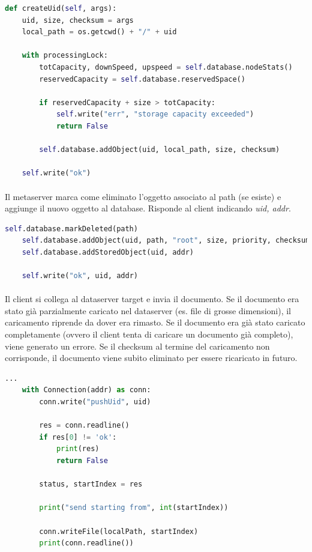 \documentclass[11pt,a4paper,english]{article}
\begin{document}
\begin{lstlisting}[language=Python, title=Dataserver]
def createUid(self, args):
	uid, size, checksum = args
	local_path = os.getcwd() + "/" + uid
	
	with processingLock:
		totCapacity, downSpeed, upspeed = self.database.nodeStats()
		reservedCapacity = self.database.reservedSpace()
		
		if reservedCapacity + size > totCapacity:
			self.write("err", "storage capacity exceeded")
			return False
		
		self.database.addObject(uid, local_path, size, checksum)
		
	self.write("ok")
\end{lstlisting}

\paragraph{} Il metaserver marca come eliminato l'oggetto associato al path (se esiste) e aggiunge il nuovo oggetto al database. Risponde al client indicando \emph{uid, addr}. 

\begin{lstlisting}[language=Python, title=Metaserver]
    self.database.markDeleted(path)
    self.database.addObject(uid, path, "root", size, priority, checksum)
    self.database.addStoredObject(uid, addr)

    self.write("ok", uid, addr)
\end{lstlisting}

\paragraph{} Il client si collega al dataserver target e invia il documento. Se il documento era stato già parzialmente caricato nel dataserver (es. file di grosse dimensioni), il caricamento riprende da dover era rimasto. Se il documento era già stato caricato completamente (ovvero il client tenta di caricare un documento già completo), viene generato un errore. Se il checksum al termine del caricamento non corrisponde, il documento viene subito eliminato per essere ricaricato in futuro. 

\begin{lstlisting}[language=Python, title=Client]
    ...
    with Connection(addr) as conn:
        conn.write("pushUid", uid)

        res = conn.readline()
        if res[0] != 'ok':
            print(res)
            return False

        status, startIndex = res

        print("send starting from", int(startIndex))

        conn.writeFile(localPath, startIndex)
        print(conn.readline())
\end{lstlisting}
\end{document}
